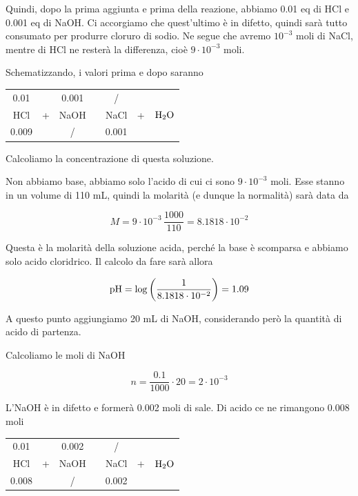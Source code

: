 Quindi, dopo la prima aggiunta e prima della reazione, abbiamo 0.01 eq di HCl e 0.001 eq di NaOH. Ci accorgiamo che quest'ultimo è in difetto, quindi sarà tutto consumato per produrre cloruro di sodio. Ne segue che avremo $10^{-3}$ moli di NaCl, mentre di HCl ne resterà la differenza, cioè $9 \cdot 10^{-3}$ moli.

Schematizzando, i valori prima e dopo saranno

\begin{center}
    \begin{tabular}{ccccccc}
        0.01 &  & 0.001 & & / & &\\
        HCl & + & NaOH & \ce{->} & NaCl & + & $\rm H_2O$\\
        0.009 &  &  / & & 0.001 & &\\
    \end{tabular}
\end{center}

Calcoliamo la concentrazione di questa soluzione.

Non abbiamo base, abbiamo solo l'acido di cui ci sono $9 \cdot 10^{-3}$ moli. Esse stanno in un volume di 110 mL, quindi la molarità (e dunque la normalità) sarà data da

$$M=9 \cdot 10^{-3} \, \frac{1000}{110}=8.1818 \cdot 10^{-2}$$

Questa è la molarità della soluzione acida, perché la base è scomparsa e abbiamo solo acido cloridrico. Il calcolo da fare sarà allora

$$\rm pH=\log\left( \frac{1}{8.1818 \cdot 10^{-2}} \right)=1.09$$

A questo punto aggiungiamo 20 mL di NaOH, considerando però la quantità di acido di partenza.

Calcoliamo le moli di NaOH

$$n=\frac{0.1}{1000}\cdot 20=2 \cdot 10^{-3}$$

L'NaOH è in difetto e formerà 0.002 moli di sale. Di acido ce ne rimangono 0.008 moli

\begin{center}
    \begin{tabular}{ccccccc}
        0.01 &  & 0.002 & & / & &\\
        HCl & + & NaOH & \ce{->} & NaCl & + & $\rm H_2O$\\
        0.008 &  &  / & & 0.002 & &\\
    \end{tabular}
\end{center}

